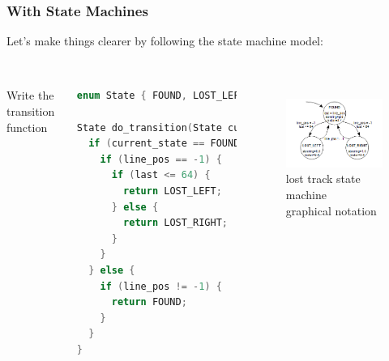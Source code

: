 \documentclass{beamer}
\begin{document}
\begin{frame}[fragile]
\frametitle{With State Machines}
Let's make things clearer by following the state machine model: \\
\hfill \\
\begin{columns}[t]
Write the transition function
\begin{lstlisting}[language=C++,basicstyle=\ttfamily\tiny]
enum State { FOUND, LOST_LEFT, LOST_RIGHT };

State do_transition(State current_state, int16_t line_pos, int16_t last) {
  if (current_state == FOUND) {
    if (line_pos == -1) {
      if (last <= 64) {
        return LOST_LEFT;
      } else {
        return LOST_RIGHT;
      }
    }
  } else {
    if (line_pos != -1) {
      return FOUND;
    }
  }
}
\end{lstlisting}

\begin{figure}[h!]
\includegraphics[width=1.0\columnwidth]{images/statemachine} \\
lost track state machine \\
graphical notation
\end{figure}
\end{columns}
\end{frame}
\end{document}
